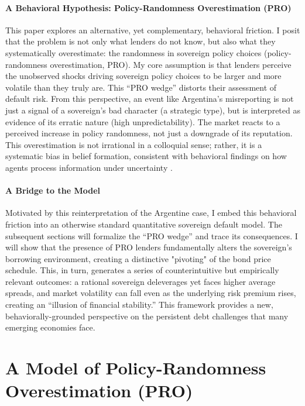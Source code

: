 \documentclass[12pt]{article}
\theoremstyle{plain}
\begin{document}
\paragraph{A Behavioral Hypothesis: Policy-Randomness Overestimation (PRO)}
This paper explores an alternative, yet complementary, behavioral friction. I
posit that the problem is not only what lenders do not know, but also what they
systematically overestimate: the randomness in sovereign policy choices
(policy-randomness overestimation, PRO). My core assumption is that lenders
perceive the unobserved shocks driving sovereign policy choices to be larger
and more volatile than they truly are. This ``PRO wedge'' distorts their
assessment of default risk. From this perspective, an event like Argentina's
misreporting is not just a signal of a sovereign's bad character (a strategic
type), but is interpreted as evidence of its erratic nature (high
unpredictability). The market reacts to a perceived increase in policy
randomness, not just a downgrade of its reputation. This overestimation is not
irrational in a colloquial sense; rather, it is a systematic bias in belief
formation, consistent with behavioral findings on how agents process
information under uncertainty \citet{TverskyKahneman1974, BarberisThaler2003}.

\paragraph{A Bridge to the Model}
Motivated by this reinterpretation of the Argentine case, I embed this
behavioral friction into an otherwise standard quantitative sovereign default
model. The subsequent sections will formalize the ``PRO wedge'' and trace its
consequences. I will show that the presence of PRO lenders fundamentally alters
the sovereign's borrowing environment, creating a distinctive "pivoting" of the
bond price schedule. This, in turn, generates a series of counterintuitive but
empirically relevant outcomes: a rational sovereign deleverages yet faces
higher average spreads, and market volatility can fall even as the underlying
risk premium rises, creating an ``illusion of financial stability.'' This
framework provides a new, behaviorally-grounded perspective on the persistent
debt challenges that many emerging economies face.

\section{A Model of Policy-Randomness Overestimation (PRO)}
\label{sec:model}
\end{document}
